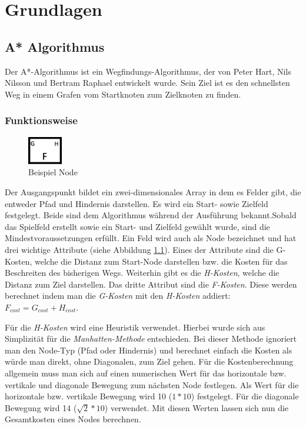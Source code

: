 \chapter{Grundlagen}
\label{sec:fundamentals}
\section{A* Algorithmus}
\label{sec:fundamentalsA*}
Der A*-Algorithmus ist ein Wegfindungs-Algorithmus, der von Peter Hart, Nils Nilsson und Bertram Raphael entwickelt wurde. Sein Ziel ist es den schnellsten Weg in einem Grafen vom Startknoten zum Zielknoten zu finden. 
\subsection{Funktionsweise}
\begin{figure}
    \includegraphics[width=1.5cm]{assets/aStarNode.png}
    \caption{Beispiel Node}
    \label{fig:aStarNode}
\end{figure}
Der Ausgangspunkt bildet ein zwei-dimensionales Array in dem es Felder gibt, die entweder Pfad und Hindernis darstellen. Es wird ein Start- sowie Zielfeld festgelegt. Beide sind dem Algorithmus während der Ausführung bekannt.Sobald das Spielfeld erstellt sowie ein Start- und Zielfeld gewählt wurde, sind die Mindestvoraussetzungen erfüllt. Ein Feld wird auch als Node bezeichnet und hat drei wichtige Attribute (siehe Abbildung \ref{fig:aStarNode}). Eines der Attribute sind die G-Kosten, welche die Distanz zum Start-Node darstellen bzw. die Kosten für das Beschreiten des bisherigen Wegs. Weiterhin gibt es die \textit{H-Kosten}, welche die Distanz zum Ziel darstellen. Das dritte Attribut sind die \textit{F-Kosten}. Diese werden berechnet indem man die \textit{G-Kosten} mit den \textit{H-Kosten} addiert: $F_{cost} = G_{cost} + H_{cost}$.\cite{astar_comparison}

Für die \textit{H-Kosten} wird eine Heuristik verwendet. Hierbei wurde sich aus Simplizität für die \textit{Manhatten-Methode} entschieden. Bei dieser Methode ignoriert man den Node-Typ (Pfad oder Hindernis) und berechnet einfach die Kosten als würde man direkt, ohne Diagonalen, zum Ziel gehen. Für die Kostenberechnung allgemein muss man sich auf einen numerischen Wert für das horizontale bzw. vertikale und diagonale Bewegung zum nächsten Node festlegen. Als Wert für die horizontale bzw. vertikale Bewegung wird 10 ($1*10$) festgelegt. Für die diagonale Bewegung wird 14 ($\sqrt{2}*10$) verwendet. Mit diesen Werten lassen sich nun die Gesamtkosten eines Nodes berechnen.

